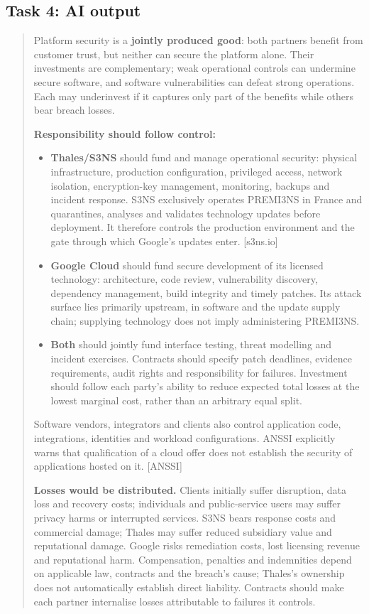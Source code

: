 \subsection{Task 4: AI output}
\begin{quote}\small
Platform security is a \textbf{jointly produced good}: both partners benefit from customer trust, but neither can secure the platform alone. Their investments are complementary; weak operational controls can undermine secure software, and software vulnerabilities can defeat strong operations. Each may underinvest if it captures only part of the benefits while others bear breach losses.

\textbf{Responsibility should follow control:}
\begin{itemize}
\item \textbf{Thales/S3NS} should fund and manage operational security: physical infrastructure, production configuration, privileged access, network isolation, encryption-key management, monitoring, backups and incident response. S3NS exclusively operates PREMI3NS in France and quarantines, analyses and validates technology updates before deployment. It therefore controls the production environment and the gate through which Google’s updates enter. [s3ns.io]
\item \textbf{Google Cloud} should fund secure development of its licensed technology: architecture, code review, vulnerability discovery, dependency management, build integrity and timely patches. Its attack surface lies primarily upstream, in software and the update supply chain; supplying technology does not imply administering PREMI3NS.
\item \textbf{Both} should jointly fund interface testing, threat modelling and incident exercises. Contracts should specify patch deadlines, evidence requirements, audit rights and responsibility for failures. Investment should follow each party’s ability to reduce expected total losses at the lowest marginal cost, rather than an arbitrary equal split.
\end{itemize}

Software vendors, integrators and clients also control application code, integrations, identities and workload configurations. ANSSI explicitly warns that qualification of a cloud offer does not establish the security of applications hosted on it. [ANSSI]

\textbf{Losses would be distributed.} Clients initially suffer disruption, data loss and recovery costs; individuals and public-service users may suffer privacy harms or interrupted services. S3NS bears response costs and commercial damage; Thales may suffer reduced subsidiary value and reputational damage. Google risks remediation costs, lost licensing revenue and reputational harm. Compensation, penalties and indemnities depend on applicable law, contracts and the breach’s cause; Thales’s ownership does not automatically establish direct liability. Contracts should make each partner internalise losses attributable to failures it controls.


\end{quote}
